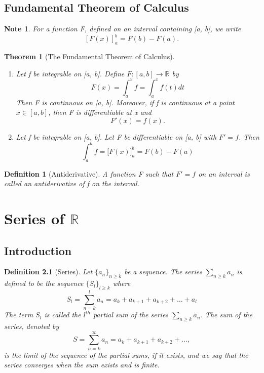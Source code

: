 \documentclass[11pt, oneside]{book}
\theoremstyle{break}
\newtheorem{thm}{Theorem}[section]
\newtheorem*{note}{Note}
\newtheorem{defn}{Definition}[section]
\newcommand{\bb}[1]{\mathbb{#1}}		%
\begin{document}
\section{Fundamental Theorem of Calculus}

\begin{note}
	For a function F, defined on an interval containing [a, b], we write
	\[
		[F(x)]_a^b = F(b) - F(a).
	\]
\end{note}

\begin{thm}[The Fundamental Theorem of Calculus]
	\begin{enumerate}
		\item Let f be integrable on [a, b]. Define $F: [a, b] \to \bb{R}$ by
			\[
				F(x) = \int_{a}^{x} f = \int_{a}^{x} f(t) dt
			\]
			Then F is continuous on [a, b]. Moreover, if f is continuous at a point $x \in [a, b]$, then F is differentiable at x and
			\[
				F'(x) = f(x).
			\]
		\item Let f be integrable on [a, b]. Let F be differentiable on [a, b] with $F' = f$. Then
			\[
				\int_{a}^{b} f = \lbrack F(x) \rbrack_a^b = F(b) - F(a)
			\]
	\end{enumerate}
\end{thm}

\begin{defn}[Antiderivative]
	A function F such that $F' = f$ on an interval is called an antiderivative of f on the interval.
\end{defn}


\chapter{Series of \texorpdfstring{$\bb{R}$}{R}}


\section{Introduction}

\begin{defn}[Series]
	Let $\{a_n\}_{n \geq k}$ be a sequence. The series $\sum_{n \geq k} a_n$ is defined to be the sequence $\{S_l\}_{l \geq k}$ where
	\[
		S_l = \sum_{n = k}^{l} a_n = a_k + a_{k + 1} + a_{k + 2} + \hdots + a_l
	\]
	The term $S_l$ is called the $l^{th}$ partial sum of the series $\sum_{n \geq k} a_n$. The sum of the series, denoted by
	\[
		S = \sum_{n = k}^{\infty} a_n = a_k + a_{k + 1} + a_{k + 2} + \hdots ,
	\]
	is the limit of the sequence of the partial sums, if it exists, and we say that the series converges when the sum exists and is finite.
\end{defn}
\end{document}
